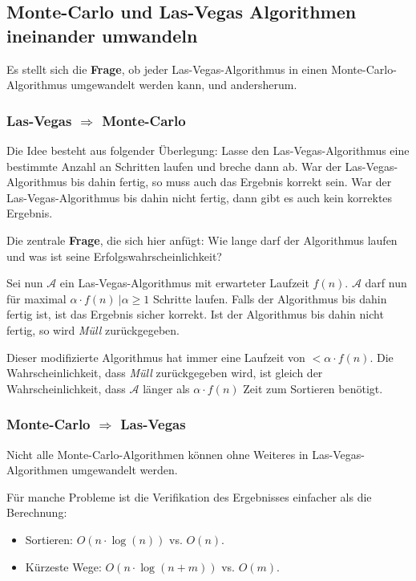 \documentclass{scrartcl}%
\begin{document}
    \subsection*{Monte-Carlo und Las-Vegas Algorithmen ineinander umwandeln}
    \label{subsec:monte-carloUndLas-vegasAlgorithmenIneinanderUmwandeln}

    Es stellt sich die \textbf{Frage}, ob jeder Las-Vegas-Algorithmus in einen Monte-Carlo-Algorithmus umgewandelt werden kann, und andersherum.

    \subsubsection*{Las-Vegas $\Rightarrow$ Monte-Carlo}
    Die Idee besteht aus folgender Überlegung: Lasse den Las-Vegas-Algorithmus eine bestimmte Anzahl an Schritten laufen und breche dann ab.
    War der Las-Vegas-Algorithmus bis dahin fertig, so muss auch das Ergebnis korrekt sein.
    War der Las-Vegas-Algorithmus bis dahin nicht fertig, dann gibt es auch kein korrektes Ergebnis.

    Die zentrale \textbf{Frage}, die sich hier anfügt: Wie lange darf der Algorithmus laufen und was ist seine Erfolgswahrscheinlichkeit?

    Sei nun $\mathcal{A}$ ein Las-Vegas-Algorithmus mit erwarteter Laufzeit $f(n)$.
    $\mathcal{A}$ darf nun für maximal $\alpha \cdot f(n)\ | \alpha \geq 1$ Schritte laufen.
    Falls der Algorithmus bis dahin fertig ist, ist das Ergebnis sicher korrekt.
    Ist der Algorithmus bis dahin nicht fertig, so wird \textit{Müll} zurückgegeben.

    Dieser modifizierte Algorithmus hat immer eine Laufzeit von $< \alpha \cdot f(n)$.
    Die Wahrscheinlichkeit, dass \textit{Müll} zurückgegeben wird, ist gleich der Wahrscheinlichkeit,
    dass $\mathcal{A}$ länger als $\alpha \cdot f(n)$ Zeit zum Sortieren benötigt.

    \subsubsection*{Monte-Carlo $\Rightarrow$ Las-Vegas}

    Nicht alle Monte-Carlo-Algorithmen können ohne Weiteres in Las-Vegas-Algorithmen umgewandelt werden.

    Für manche Probleme ist die Verifikation des Ergebnisses einfacher als die Berechnung:
    \begin{itemize}
        \item Sortieren: $O(n \cdot \log(n))$ \quad vs. \quad $O(n)$.
        \item Kürzeste Wege: $O(n \cdot \log(n+m))$ \quad vs. \quad $O(m)$.
    \end{itemize}
\end{document}
